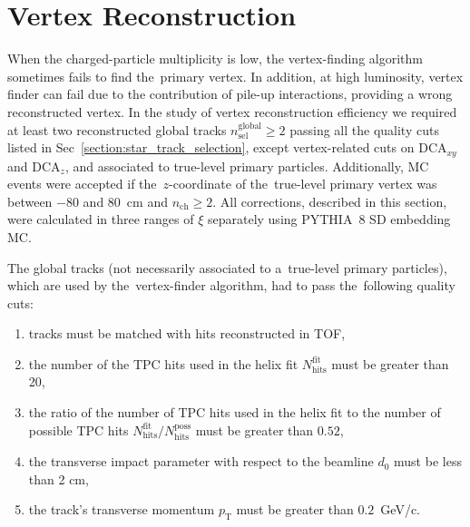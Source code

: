 \section{Vertex Reconstruction}\label{section:star_vertex}
When the charged-particle multiplicity is low, the vertex-finding algorithm sometimes fails to find the~primary vertex. In addition, at high luminosity, vertex finder can fail due to the contribution of pile-up interactions,  providing a wrong reconstructed vertex. In the study of vertex reconstruction efficiency we required at least two reconstructed global tracks $n^\textrm{global}_\textrm{sel}\geq 2$ passing all the quality cuts listed in Sec~\ref{section:star_track_selection}, except vertex-related cuts on $\textrm{DCA}_{xy}$ and $\textrm{DCA}_{z}$,  and  associated to true-level primary particles.  Additionally, MC events were accepted if the~$z$-coordinate of the~true-level primary vertex was between $-80$ and $80$~cm and $n_\textrm{ch}\geq 2$. All corrections, described in this section, were calculated in three ranges of $\xi$ separately using PYTHIA~8 \ac{SD} embedding \ac{MC}.

The global tracks (not necessarily associated to a~true-level primary particles), which are used by the~vertex-finder algorithm, had to pass the~following quality cuts:
\begin{enumerate}
	\item tracks must be matched with hits reconstructed in TOF,
	\item the number of the TPC hits used in the helix fit $N_\textrm{hits}^\textrm{fit}$ must be greater than 20,
	\item the ratio of the number of TPC hits used in the helix fit to the number of possible TPC hits $N_\textrm{hits}^\textrm{fit}/N_\textrm{hits}^\textrm{poss}$ must be greater than $0.52$,
	\item the transverse impact parameter with respect to the beamline $d_0$ must be less than 2 cm,
	\item the track's transverse momentum $p_\textrm{T}$ must be greater than $0.2$~GeV/c.
\end{enumerate}




